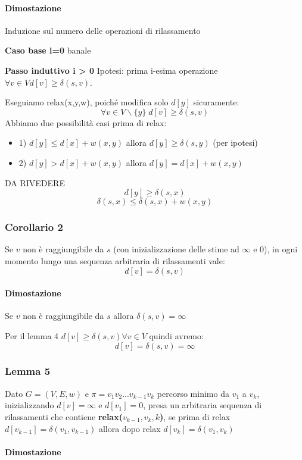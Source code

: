 \paragraph{Dimostazione} Induzione sul numero delle operazioni di rilassamento \smallskip

\textbf{Caso base i=0} banale \medskip

\textbf{Passo induttivo i > 0} Ipotesi: prima i-esima operazione $\forall v \in V d[v] \ge \delta(s,v)$. \smallskip

Eseguiamo relax(x,y,w), poiché modifica solo $d[y]$ sicuramente:
$$ \forall v \in V \backslash\{y\} \; d[v] \ge \delta(s,v) $$
Abbiamo due possibilità casi prima di relax:
\begin{itemize}
    \item 1) $d[y] \le d[x]+w(x,y)$ allora $d[y] \ge \delta(s,y)$ (per ipotesi)
    \item 2) $d[y] > d[x]+w(x,y)$ allora $d[y]=d[x]+w(x,y)$
\end{itemize}
DA RIVEDERE
$$ d[y] \ge \delta(s,x)$$
$$ \delta(s,x) \le \delta(s,x)+w(x,y)$$

\subsubsection{Corollario 2}
Se $v$ non è raggiungibile da $s$ (con inizializzazione delle stime ad $\infty$ e $0$), in ogni momento lungo una sequenza arbitraria di rilassamenti vale:
$$ d[v]=\delta(s,v)$$
\paragraph{Dimostazione} Se $v$ non è raggiungibile da $s$ allora $\delta(s,v)=\infty$ \smallskip

Per il lemma 4 $d[v] \ge \delta(s,v) \forall v \in V$ quindi avremo:
$$ d[v]=\delta(s,v)=\infty$$

\subsubsection{Lemma 5}
Dato $G=(V,E,w)$ e $\pi=v_1v_2...v_{k-1}v_k$ percorso minimo da $v_1$ a $v_k$, inizializzando $d[v]=\infty$ e $d[v_1]=0$, presa un arbitraria sequenza di rilassamenti che contiene \textbf{relax($v_{k-1}, v_k, k$)}, se prima di relax $d[v_{k-1}]=\delta(v_1,v_{k-1})$ allora dopo relax $d[v_k]=\delta(v_1,v_k)$
\paragraph{Dimostazione} \blindtext